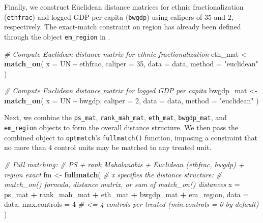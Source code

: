 \documentclass[
  12pt,
  leqno]{article}
\newenvironment{Shaded}{\begin{snugshade}}{\end{snugshade}}
\newcommand{\AttributeTok}[1]{\textcolor[rgb]{0.13,0.29,0.53}{#1}}
\newcommand{\CommentTok}[1]{\textcolor[rgb]{0.56,0.35,0.01}{\textit{#1}}}
\newcommand{\DecValTok}[1]{\textcolor[rgb]{0.00,0.00,0.81}{#1}}
\newcommand{\FunctionTok}[1]{\textcolor[rgb]{0.13,0.29,0.53}{\textbf{#1}}}
\newcommand{\NormalTok}[1]{#1}
\newcommand{\OtherTok}[1]{\textcolor[rgb]{0.56,0.35,0.01}{#1}}
\newcommand{\SpecialCharTok}[1]{\textcolor[rgb]{0.81,0.36,0.00}{\textbf{#1}}}
\newcommand{\StringTok}[1]{\textcolor[rgb]{0.31,0.60,0.02}{#1}}
\begin{document}
\doublespacing

Finally, we construct Euclidean distance matrices for ethnic
fractionalization (\texttt{ethfrac}) and logged GDP per capita
(\texttt{bwgdp}) using calipers of \(35\) and \(2\), respectively. The
exact-match constraint on region has already been defined through the
object \texttt{em\_region} in
.

\singlespacing

\begin{Shaded}
\begin{Highlighting}[]
\CommentTok{\# Compute Euclidean distance matrix for ethnic fractionalization}
\NormalTok{eth\_mat }\OtherTok{\textless{}{-}} \FunctionTok{match\_on}\NormalTok{(}
  \AttributeTok{x =}\NormalTok{ UN }\SpecialCharTok{\textasciitilde{}}\NormalTok{ ethfrac,}
  \AttributeTok{caliper =} \DecValTok{35}\NormalTok{,}
  \AttributeTok{data =}\NormalTok{ data,}
  \AttributeTok{method =} \StringTok{"euclidean"}
\NormalTok{)}

\CommentTok{\# Compute Euclidean distance matrix for logged GDP per capita}
\NormalTok{bwgdp\_mat }\OtherTok{\textless{}{-}} \FunctionTok{match\_on}\NormalTok{(}
  \AttributeTok{x =}\NormalTok{ UN }\SpecialCharTok{\textasciitilde{}}\NormalTok{ bwgdp,}
  \AttributeTok{caliper =} \DecValTok{2}\NormalTok{,}
  \AttributeTok{data =}\NormalTok{ data,}
  \AttributeTok{method =} \StringTok{"euclidean"}
\NormalTok{)}
\end{Highlighting}
\end{Shaded}

\doublespacing

Next, we combine the \texttt{ps\_mat}, \texttt{rank\_mah\_mat},
\texttt{eth\_mat}, \texttt{bwgdp\_mat}, and \texttt{em\_region} objects
to form the overall distance structure. We then pass the combined object
to \texttt{optmatch}'s \texttt{fullmatch()} function, imposing a
constraint that no more than \(4\) control units may be matched to any
treated unit.

\singlespacing

\begin{Shaded}
\begin{Highlighting}[]
\CommentTok{\# Full matching: }
\CommentTok{\# PS + rank Mahalanobis + Euclidean (ethfrac, bwgdp) + region exact}
\NormalTok{fm }\OtherTok{\textless{}{-}} \FunctionTok{fullmatch}\NormalTok{(}
\CommentTok{\# x specifies the distance structure:}
\CommentTok{\# match\_on() formula, distance matrix, or sum of match\_on() distances}
  \AttributeTok{x            =}\NormalTok{ ps\_mat }\SpecialCharTok{+}\NormalTok{ rank\_mah\_mat }\SpecialCharTok{+}\NormalTok{ eth\_mat }\SpecialCharTok{+}\NormalTok{ bwgdp\_mat }\SpecialCharTok{+}\NormalTok{ em\_region,}
  \AttributeTok{data         =}\NormalTok{ data,}
  \AttributeTok{max.controls =} \DecValTok{4} \CommentTok{\# \textless{}= 4 controls per treated (min.controls = 0 by default)}
\NormalTok{)}
\end{Highlighting}
\end{Shaded}
\end{document}
